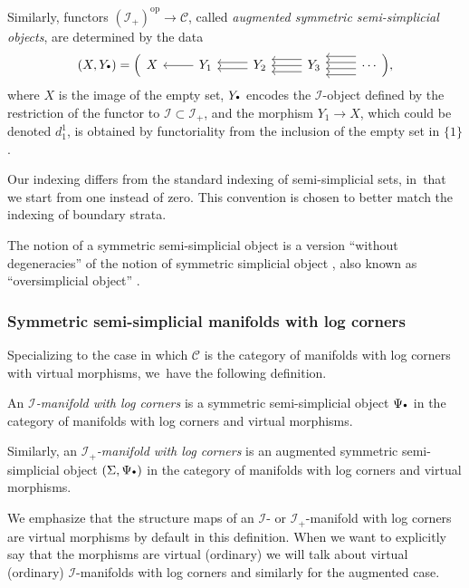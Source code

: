 \documentclass[JEP,XML,SOM,Unicode,NoFloatCountersInSection,published]{cedram}
\let\oldbullet\bullet
\renewcommand{\bullet}{{\raisebox{1pt}{$\scriptscriptstyle\oldbullet$}}}
\newcommand{\rBrac}[1]{\Bigl(#1\Bigr)}
\theoremstyle{definition}
\theoremstyle{remark}
\newenvironment{remark}
  {\pushQED{\qed}\renewcommand{\qedsymbol}{$\lozenge$}\remarkx}
  {\popQED\endremarkx}
\let\defn\emph
\newcommand{\augsimp}[4]
{
\begin{tikzcd}[ampersand replacement=\&]
     #1 \& #2 \ar[l] \& #3
     \ar[l,shift left = 1]\ar[l,shift right=1] \& #4 \ar[l,shift left = 2]\ar[l,shift left = 0]\ar[l,shift left = -2] \& \ar[l,shift left = 3]\ar[l,shift left = 1]\ar[l,shift left = -1]\ar[l,shift left = -3] \cdots
    \end{tikzcd}
}
\newcommand{\scat}{\mathscr{I}}
\newcommand{\ascat}{\mathscr{I}_+}
\newcommand{\op}{\mathrm{op}}
\begin{document}
Similarly, functors $(\ascat)^\op \to \mathscr{C}$, called \defn{augmented symmetric semi-simplicial objects}, are determined by the data\vspace*{-3pt}\enlargethispage{.5\baselineskip}
\[
(X,Y_\bullet) = \rBrac{\augsimp{X}{Y_1}{Y_2}{Y_3}},
\]
where $X$ is the image of the empty set, $Y_\bullet$ encodes the $\scat$-object defined by the restriction of the functor to $\scat\subset\ascat$, and the morphism $Y_1 \to X$, which could be denoted $d^1_1$, is obtained by functoriality from the inclusion of the empty set in $\{1\}$.

\begin{remark}
Our indexing differs from the standard indexing of semi-simplicial sets, in~that we start from one instead of zero. This convention is chosen to better match the indexing of boundary strata.
\end{remark}

\begin{remark}
The notion of a symmetric semi-simplicial object is a version ``without degeneracies'' of the notion of symmetric simplicial object \cite{grandis}, also known as ``oversimplicial object'' \cite{saitowild}.
\end{remark}

\subsubsection{Symmetric semi-simplicial manifolds with log corners}

Specializing to the case in which $\mathscr{C}$ is the category of manifolds with log corners with virtual morphisms, we~have the following definition.

\begin{definition}
An \defn{$\scat$-manifold with log corners} is a symmetric semi-simplicial object $\Psi_\bullet$ in the category of manifolds with log corners and virtual morphisms.

Similarly, an \defn{$\ascat$-manifold with log corners} is an augmented symmetric semi-simplicial object $(\Sigma,\Psi_\bullet)$ in the category of manifolds with log corners and virtual morphisms.
\end{definition}

We emphasize that the structure maps of an $\scat$- or $\ascat$-manifold with log corners are virtual morphisms by default in this definition. When we want to explicitly say that the morphisms are virtual (\resp ordinary) we will talk about virtual (\resp ordinary) $\scat$-manifolds with log corners and similarly for the augmented case.
\end{document}
